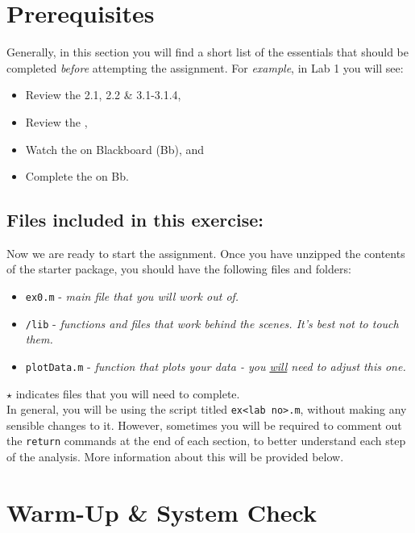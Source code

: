 \documentclass[11pt, letterpaper]{article}
\begin{document}
\section*{Prerequisites}
Generally, in this section you will find a short list of the essentials that should be completed \textit{before} attempting the assignment. For \textit{example}, in Lab 1 you will see:
{\small
\begin{itemize}
    \item Review the  2.1, 2.2 \& 3.1-3.1.4,
    \item Review the , 
    \item Watch the  on Blackboard (Bb), and
    \item Complete the  on Bb.
\end{itemize}
}


\subsection*{Files included in this exercise:}
Now we are ready to start the assignment. Once you have unzipped the contents of the starter package, you should have the following files and folders:

\begin{itemize}
\renewcommand\labelitemi{-- }
   \item \texttt{ex0.m} - \it{main file that you will work out of.}
    \item \texttt{/lib} - \it{functions and files that work behind the scenes. It's best not to touch them.}
\renewcommand\labelitemi{[$\star$]}
    \item \texttt{plotData.m} - \it{function that plots your data - you \ul{will} need to adjust this one.}
\end{itemize}

\noindent
$\star$ indicates files that you will need to complete.\\

In general, you will be using the script titled \texttt{ex<lab no>.m}, without making any sensible changes to it. However, sometimes you will be required to comment out the \texttt{return} commands at the end of each section, to better understand each step of the analysis. More information about this will be provided below.

\setcounter{section}{-1}
\section{Warm-Up \& System Check}
\end{document}
